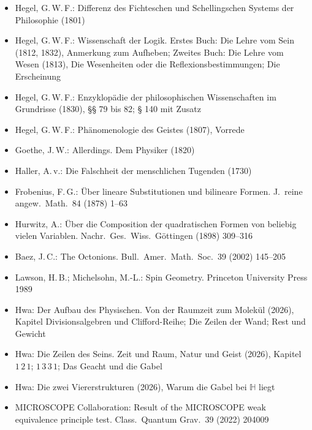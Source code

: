 \documentclass[11pt,a4paper]{article}
\newcommand{\HH}{\mathbb H}
\begin{document}
\begin{itemize}[leftmargin=1.2em,itemsep=0pt]
\item Hegel, G.\,W.\,F.: Differenz des Fichteschen und Schellingschen Systems der Philosophie (1801)
\item Hegel, G.\,W.\,F.: Wissenschaft der Logik. Erstes Buch: Die Lehre vom Sein (1812, 1832), Anmerkung zum Aufheben; Zweites Buch: Die Lehre vom Wesen (1813), Die Wesenheiten oder die Reflexionsbestimmungen; Die Erscheinung
\item Hegel, G.\,W.\,F.: Enzyklopädie der philosophischen Wissenschaften im Grundrisse (1830), §§ 79 bis 82; § 140 mit Zusatz
\item Hegel, G.\,W.\,F.: Phänomenologie des Geistes (1807), Vorrede
\item Goethe, J.\,W.: Allerdings. Dem Physiker (1820)
\item Haller, A.\,v.: Die Falschheit der menschlichen Tugenden (1730)
\item Frobenius, F.\,G.: Über lineare Substitutionen und bilineare Formen. J.\ reine angew.\ Math.\ 84 (1878) 1--63
\item Hurwitz, A.: Über die Composition der quadratischen Formen von beliebig vielen Variablen. Nachr.\ Ges.\ Wiss.\ Göttingen (1898) 309--316
\item Baez, J.\,C.: The Octonions. Bull.\ Amer.\ Math.\ Soc.\ 39 (2002) 145--205
\item Lawson, H.\,B.; Michelsohn, M.-L.: Spin Geometry. Princeton University Press 1989
\item Hwa: Der Aufbau des Physischen. Von der Raumzeit zum Molekül (2026), Kapitel Divisionsalgebren und Clifford-Reihe; Die Zeilen der Wand; Rest und Gewicht
\item Hwa: Die Zeilen des Seins. Zeit und Raum, Natur und Geist (2026), Kapitel $1\,2\,1$; $1\,3\,3\,1$; Das Geacht und die Gabel
\item Hwa: Die zwei Viererstrukturen (2026), Warum die Gabel bei $\HH$ liegt
\item MICROSCOPE Collaboration: Result of the MICROSCOPE weak equivalence principle test. Class.\ Quantum Grav.\ 39 (2022) 204009
\end{itemize}

\vfill
\sloppy
\end{document}
